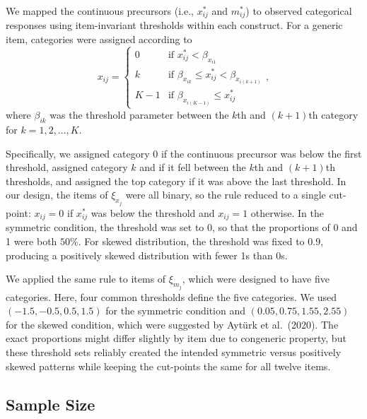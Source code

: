 \documentclass[
  man]{apa6}
\begin{document}
We mapped the continuous precursors (i.e., \(x_{ij}^*\) and \(m_{ij}^*\)) to observed categorical responses using item-invariant thresholds within each construct. For a generic item, categories were assigned according to
\begin{equation}
  x_{ij} =
    \begin{cases}
      0 & \text{if $x_{ij}^* < \beta_{x_{i1}}$}\\
      k & \text{if $\beta_{x_{ik}} \le x_{ij}^* < \beta_{x_{i(k + 1)}}$}\\
      K - 1 & \text{if $\beta_{x_{i(K - 1)}} \le x_{ij}^*$}
    \end{cases},      
\end{equation}
where \(\beta_{ik}\) was the threshold parameter between the \(k\)th and \((k + 1)\)th category for \(k = 1, 2,...,K\).

Specifically, we assigned category \(0\) if the continuous precursor was below the first threshold, assigned category \(k\) and if it fell between the \(k\)th and \((k + 1)\)th thresholds, and assigned the top category if it was above the last threshold. In our design, the items of \(\xi_{x_{j}}\) were all binary, so the rule reduced to a single cut-point: \(x_{ij} = 0\) if \(x_{ij}^*\) was below the threshold and \(x_{ij} = 1\) otherwise. In the symmetric condition, the threshold was set to 0, so that the proportions of 0 and 1 were both \(50\%\). For skewed distribution, the threshold was fixed to 0.9, producing a positively skewed distribution with fewer 1s than 0s.

We applied the same rule to items of \(\xi_{m_{j}}\), which were designed to have five categories. Here, four common thresholds define the five categories. We used \((-1.5, -0.5, 0.5, 1.5)\) for the symmetric condition and \((0.05, 0.75, 1.55, 2.55)\) for the skewed condition, which were suggested by Aytürk et al.~(2020). The exact proportions might differ slightly by item due to congeneric property, but these threshold sets reliably created the intended symmetric versus positively skewed patterns while keeping the cut-points the same for all twelve items.

\subsection{Sample Size}\label{sample-size}
\end{document}
